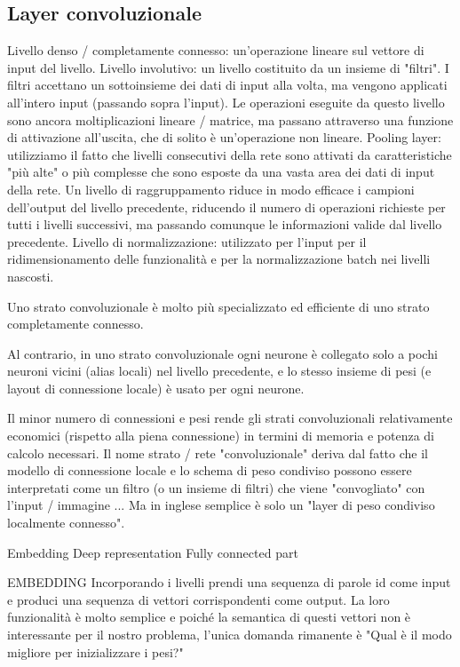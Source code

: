 \subsection{Layer convoluzionale}
\label{subsec:layerconv}
Livello denso / completamente connesso: un'operazione lineare sul vettore di input del livello.
Livello involutivo: un livello costituito da un insieme di "filtri". I filtri accettano un sottoinsieme dei dati di input alla volta, ma vengono applicati all'intero input (passando sopra l'input). Le operazioni eseguite da questo livello sono ancora moltiplicazioni lineare / matrice, ma passano attraverso una funzione di attivazione all'uscita, che di solito è un'operazione non lineare.
Pooling layer: utilizziamo il fatto che livelli consecutivi della rete sono attivati da caratteristiche "più alte" o più complesse che sono esposte da una vasta area dei dati di input della rete. Un livello di raggruppamento riduce in modo efficace i campioni dell'output del livello precedente, riducendo il numero di operazioni richieste per tutti i livelli successivi, ma passando comunque le informazioni valide dal livello precedente.
Livello di normalizzazione: utilizzato per l'input per il ridimensionamento delle funzionalità e per la normalizzazione batch nei livelli nascosti.



Uno strato convoluzionale è molto più specializzato ed efficiente di uno strato completamente connesso.



Al contrario, in uno strato convoluzionale ogni neurone è collegato solo a pochi neuroni vicini (alias locali) nel livello precedente, e lo stesso insieme di pesi (e layout di connessione locale) è usato per ogni neurone.

Il minor numero di connessioni e pesi rende gli strati convoluzionali relativamente economici (rispetto alla piena connessione) in termini di memoria e potenza di calcolo necessari.
Il nome strato / rete "convoluzionale" deriva dal fatto che il modello di connessione locale e lo schema di peso condiviso possono essere interpretati come un filtro (o un insieme di filtri) che viene "convogliato" con l'input / immagine ... Ma in inglese semplice è solo un "layer di peso condiviso localmente connesso".

Embedding
Deep representation
Fully connected part


EMBEDDING
Incorporando i livelli prendi una sequenza di parole id come input e produci una sequenza di vettori corrispondenti come output. La loro funzionalità è molto semplice e poiché la semantica di questi vettori non è interessante per il nostro problema, l'unica domanda rimanente è "Qual è il modo migliore per inizializzare i pesi?"

